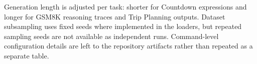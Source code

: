 Generation length is adjusted per task: shorter for Countdown expressions and longer for GSM8K reasoning traces and Trip Planning outputs. Dataset subsampling uses fixed seeds where implemented in the loaders, but repeated sampling seeds are not available as independent runs. Command-level configuration details are left to the repository artifacts rather than repeated as a separate table.
